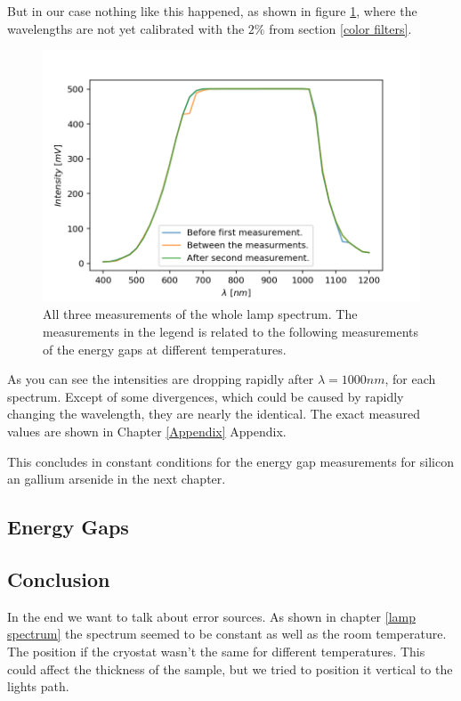 \documentclass[]{article}
\begin{document}
But in our case nothing like this happened, as shown in figure \ref{fig:lamp spectra}, where the wavelengths are not yet calibrated with the $2\%$ from section \ref{color filters}.

\begin{figure}[H]
\centering
\includegraphics[width=.8\textwidth]{Plots/All-Lamp-Spectra.png}
\caption{All three measurements of the whole lamp spectrum. The measurements in the legend is related to the following measurements of the energy gaps at different temperatures. }
\label{fig:lamp spectra}
\end{figure} 

As you can see the intensities are dropping rapidly after  $\lambda =1000nm$, for each spectrum. Except of some divergences, which could be caused by rapidly changing the wavelength, they are nearly the identical. The exact measured values are shown in Chapter \ref{Appendix} Appendix.

This concludes in constant conditions for the energy gap measurements for silicon an gallium arsenide in the next chapter.

\subsection{Energy Gaps}

\subsection{Conclusion} \label{Conclusion}
In the end we want to talk about error sources. As shown in chapter \ref{lamp spectrum} the spectrum seemed to be constant as well as the room temperature. The position if the cryostat wasn't the same for different temperatures. This could affect the thickness of the sample, but we tried to position it vertical to the lights path. 
\end{document}
